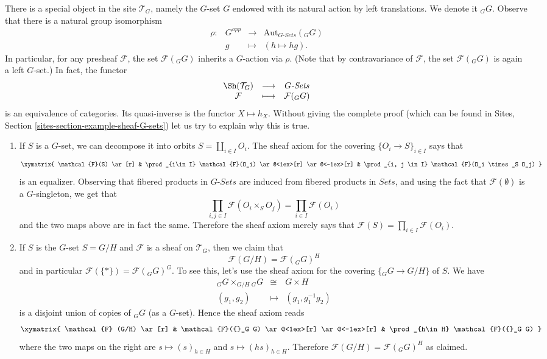 \medskip\noindent
There is a special object in the site $\mathcal{T}_G$, namely the $G$-set $G$
endowed with its natural action by left translations. We denote it ${}_G G$.
Observe that there is a natural group isomorphism
$$
\begin{matrix}
\rho : & G^{opp} & \longrightarrow & \text{Aut}_{G\textit{-Sets}}({}_G G) \\
& g & \longmapsto & (h \mapsto hg).
\end{matrix}
$$
In particular, for any presheaf $\mathcal{F}$, the set $\mathcal{F}({}_G G)$
inherits a $G$-action via $\rho$. (Note that by contravariance of
$\mathcal{F}$, the set $\mathcal{F}({}_G G)$ is again a left $G$-set.) In fact,
the functor
$$
\begin{matrix}
\Sh(\mathcal{T}_G) & \longrightarrow & G\textit{-Sets} \\
\mathcal{F} & \longmapsto & \mathcal{F}({}_G G)
\end{matrix}
$$
is an equivalence of categories. Its quasi-inverse is the functor $X \mapsto
h_X$. Without giving the complete proof (which can be found in
Sites, Section \ref{sites-section-example-sheaf-G-sets})
let us try to explain why this is true.
\begin{enumerate}
\item
If $S$ is a $G$-set, we can decompose it into orbits $S = \coprod_{i\in I}
O_i$. The sheaf axiom for the covering $\{O_i \to S\}_{i\in I}$ says that
$$
\xymatrix{
\mathcal{F}(S) \ar[r] &
\prod_{i\in I} \mathcal{F}(O_i) \ar@<1ex>[r] \ar@<-1ex>[r] &
\prod_{i, j \in I} \mathcal{F}(O_i \times_S O_j)
}
$$
is an equalizer. Observing that fibered products in $G\textit{-Sets}$ are
induced from fibered products in $\textit{Sets}$, and using the fact that
$\mathcal{F}(\emptyset)$ is a $G$-singleton, we get that
$$
\prod_{i, j \in I} \mathcal{F}(O_i \times_S O_j) = \prod_{i \in I}
\mathcal{F}(O_i)
$$
and the two maps above are in fact the same. Therefore the sheaf axiom merely
says that $\mathcal{F}(S) = \prod_{i\in I} \mathcal{F}(O_i)$.
\item
If $S$ is the $G$-set $S= G/H$ and $\mathcal{F}$ is a sheaf on $\mathcal{T}_G$,
then we claim that
$$
\mathcal{F}(G/H) = \mathcal{F}({}_G G)^H
$$
and in particular $\mathcal{F}(\{*\}) = \mathcal{F}({}_G G)^G$. To see this,
let's use the sheaf axiom for the covering $\{ {}_G G \to G/H \}$ of $S$. We
have
\begin{eqnarray*}
{}_G G \times_{G/H} {}_G G & \cong & G \times H \\
(g_1, g_2) & \longmapsto & (g_1, g_1^{-1} g_2)
\end{eqnarray*}
is a disjoint union of copies of ${}_G G$ (as a $G$-set). Hence the sheaf axiom
reads
$$
\xymatrix{
\mathcal{F} (G/H) \ar[r] &
\mathcal{F}({}_G G) \ar@<1ex>[r] \ar@<-1ex>[r] &
\prod_{h\in H} \mathcal{F}({}_G G)
}
$$
where the two maps on the right are $s \mapsto (s)_{h \in H}$ and $s \mapsto
(hs)_{h \in H}$. Therefore $\mathcal{F}(G/H) = \mathcal{F}({}_G G)^H$ as
claimed.
\end{enumerate}
